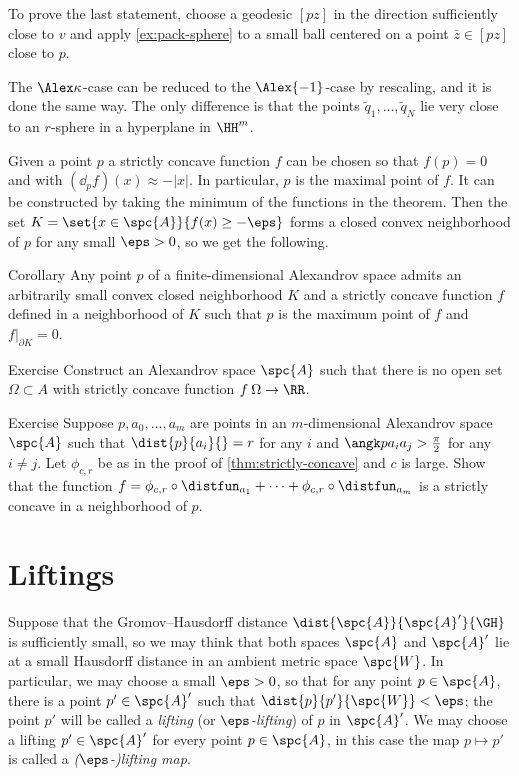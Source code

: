 To prove the last statement, choose a geodesic $[pz]$ in the direction sufficiently close to $v$ and apply \ref{ex:pack-sphere} to a small ball centered on a point $\bar z\in [pz]$ close to $p$.

The $\Alex\kappa$-case can be reduced to the $\Alex{-1}$-case by rescaling, and it is done the same way.
The only difference is that the points $\tilde q_1,\dots,\tilde q_N$ lie very close to an $r$-sphere in a hyperplane in $\HH^m$.
\qeds

Given a point $p$ a strictly concave function $f$ can be chosen so that
$f(p)=0$ and with $(\dd_p f)(x)\approx-|x|$.
In particular, $p$ is the maximal point of $f$.
It can be constructed by taking the minimum of the functions in the theorem.
Then the set $K=\set{x\in\spc{A}}{f(x)\ge -\eps}$ forms a closed convex neighborhood of $p$ for any small $\eps>0$, so we get the following.


\begin{thm}{Corollary}\label{cor:convex-nbhd}
Any point $p$ of a finite-dimensional Alexandrov space admits an arbitrarily small convex closed neighborhood $K$ and a strictly concave function $f$ defined in a neighborhood of $K$ such that $p$ is the maximum point of $f$
and $f|_{\partial K}=0$.
\end{thm}

\begin{thm}{Exercise}\label{ex:no-conc}
Construct an Alexandrov space $\spc{A}$ such that
there is no open set $\Omega\subset A$ with strictly concave function $f\:\Omega\to\RR$.
\end{thm}

\begin{thm}{Exercise}\label{ex:dist-chart+strictly-concave}
Suppose $p,a_0,\dots,a_m$ are points in an $m$-dimensional Alexandrov space $\spc{A}$ such that $\dist{p}{a_i}{}=r$ for any $i$ and $\angk p{a_i}{a_j}>\tfrac\pi2$
for any $i\ne j$.
Let $\phi_{c,r}$ be as in the proof of \ref{thm:strictly-concave} and $c$ is large.
Show that the function $f=\phi_{c,r}\circ\distfun_{a_1}+\dots+\phi_{c,r}\circ\distfun_{a_m}$
is a strictly concave in a neighborhood of $p$.
\end{thm}


\section{Liftings}\label{sec:Liftings}

Suppose that the Gromov--Hausdorff distance $\dist{\spc{A}}{\spc{A}'}{\GH}$ is sufficiently small, so we may think that both spaces $\spc{A}$ and $\spc{A}'$ lie at a small Hausdorff distance in an ambient metric space $\spc{W}$.
In particular, we may choose a small $\eps>0$, so that for any point $p\in \spc{A}$, there is a point $p'\in \spc{A}'$ such that $\dist{p}{p'}{\spc{W}}<\eps$;
the point $p'$ will be called a \emph{lifting} (or {}\emph{$\eps$-lifting}) of $p$ in $\spc{A}'$.
We may choose a lifting $p'\in\spc{A}'$ for every point $p\in\spc{A}$, 
in this case the map $p\mapsto p'$ is called a {}\emph{($\eps$-)lifting map}.

